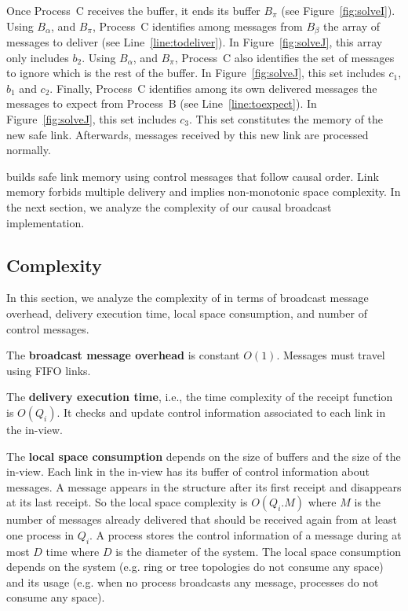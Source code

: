 \noindent Once Process~C receives the buffer, it ends its buffer $B_\pi$ (see
Figure~\ref{fig:solveI}). Using $B_\alpha$, and $B_\pi$, Process~C identifies
among messages from $B_\beta$ the array of messages to deliver (see
Line~\ref{line:todeliver}). In Figure~\ref{fig:solveJ}, this array only includes
$b_2$.  Using $B_\alpha$, and $B_\pi$, Process~C also identifies the set of
messages to ignore which is the rest of the buffer. In Figure~\ref{fig:solveJ},
this set includes $c_1$, $b_1$ and $c_2$. Finally, Process~C identifies among its own
delivered messages the messages to expect from Process~B (see
Line~\ref{line:toexpect}). In Figure~\ref{fig:solveJ}, this set includes $c_3$.
This set constitutes the memory of the new safe link.  Afterwards, messages
received by this new link are processed normally.


\RPCBROADCAST builds safe link memory using control messages that follow causal
order. Link memory forbids multiple delivery and implies non-monotonic space
complexity. In the next section, we analyze the complexity of our causal
broadcast implementation.

\subsection{Complexity}
\label{subsec:complexity}

In this section, we analyze the complexity of \RPCBROADCAST in terms of
broadcast message overhead, delivery execution time, local space consumption,
and number of control messages.

\noindent The \textbf{broadcast message overhead} is constant $O(1)$. Messages
must travel using FIFO links.

\noindent The \textbf{delivery execution time}, i.e., the time complexity of the
receipt function is $O(Q_i)$. It checks and update control information
associated to each link in the in-view.

\noindent The \textbf{local space consumption} depends on the size of buffers
and the size of the in-view. Each link in the in-view has its buffer of control
information about messages. A message appears in the structure after its first
receipt and disappears at its last receipt. So the local space complexity is
$O(Q_i.M)$ where $M$ is the number of messages already delivered that should be
received again from at least one process in $Q_i$. A process stores the control
information of a message during at most $D$ time where $D$ is the diameter of
the system. The local space consumption depends on the system (e.g. ring or tree
topologies do not consume any space) and its usage (e.g. when no process
broadcasts any message, processes do not consume any space).

